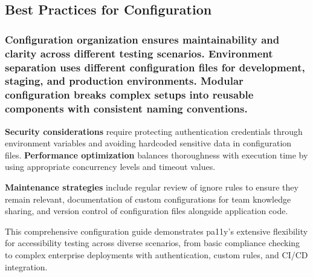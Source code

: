 \subsection{Best Practices for
Configuration}\label{best-practices-for-configuration}

\subsubsection{\texorpdfstring{Configuration organization ensures
maintainability and clarity across different testing scenarios.
\textbf{Environment separation} uses different configuration files for
development, staging, and production environments. \textbf{Modular
configuration} breaks complex setups into reusable components with
consistent naming
conventions.}{Configuration organization ensures maintainability and clarity across different testing scenarios. Environment separation uses different configuration files for development, staging, and production environments. Modular configuration breaks complex setups into reusable components with consistent naming conventions.}}\label{configuration-organization-ensures-maintainability-and-clarity-across-different-testing-scenarios.-environment-separation-uses-different-configuration-files-for-development-staging-and-production-environments.-modular-configuration-breaks-complex-setups-into-reusable-components-with-consistent-naming-conventions.}

\textbf{Security considerations} require protecting authentication
credentials through environment variables and avoiding hardcoded
sensitive data in configuration files. \textbf{Performance optimization}
balances thoroughness with execution time by using appropriate
concurrency levels and timeout values.

\textbf{Maintenance strategies} include regular review of ignore rules
to ensure they remain relevant, documentation of custom configurations
for team knowledge sharing, and version control of configuration files
alongside application code.

This comprehensive configuration guide demonstrates pa11y's extensive
flexibility for accessibility testing across diverse scenarios, from
basic compliance checking to complex enterprise deployments with
authentication, custom rules, and CI/CD integration.
